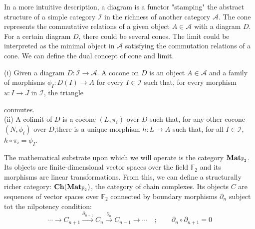 \documentclass[12pt, twoside, openany]{book}
\newcommand{\catname}[1]{{\normalfont\textbf{#1}}}
\newcommand{\Ch}{\catname{Ch}}
\newcommand{\Mat}{\catname{Mat}}
\begin{document}
In a more intuitive description, a diagram is a functor "stamping" the abstract structure of a simple category $\mathcal{I}$ in the richness of another category $\mathcal{A}$. The cone represents the commutative relations of a given object $A \in \mathcal{A}$ with a diagram $D$. For a certain diagram $D$, there could be several cones. The limit could be interpreted as the minimal object in $\mathcal{A}$ satisfying the commutation relations of a cone. We can define the dual concept of cone and limit.

\begin{definition} \label{cocone_colimit}
    (i) Given a diagram $D: \mathcal{I} \rightarrow \mathcal{A}$. A cocone on $D$ is an object $A \in \mathcal{A}$ and a family of morphisms $\phi_I: D(I) \rightarrow A$ for every $I \in \mathcal{I}$ such that, for every morphism $u: I \rightarrow J$ in $\mathcal{I}$, the triangle \\
    \begin{center}
    \end{center}
    conmutes. \\
    (ii) A colimit of $D$ is a cocone $(L, \pi_i)$ over $D$ such that, for any other cocone $(N, \phi_i)$ over $D$,there is a unique morphism $h: L \rightarrow A$ such that, for all $I \in \mathcal{I}$, $h \circ \pi_i= \phi_I$.
\end{definition}

The mathematical substrate upon which we will operate is the category $\Mat_{\mathbb{F}_2}$. Its objects are finite-dimensional vector spaces over the field $\mathbb{F}_2$ and its morphisms are linear transformations. From this, we can define a structurally richer category: $\Ch(\Mat_{\mathbb{F}_2})$, the category of chain complexes. Its objects $C$ are sequences of vector spaces over $\mathbb{F}_2$
connected by boundary morphisms $\partial_n$ subject tot the nilpotency condition:
\begin{equation}
    \cdots \rightarrow C_{n+1} \xrightarrow{\partial_{n+1}} C_n \xrightarrow{\partial_n} C_{n-1} \rightarrow \cdots \quad ; \qquad \partial_n \circ \partial_{n+1} = 0
\end{equation}
\end{document}
